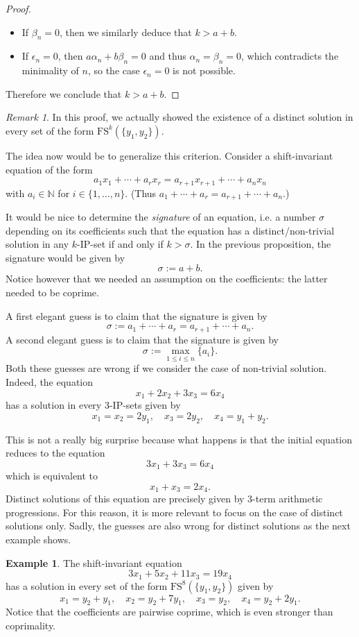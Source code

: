 \documentclass{article}
\theoremstyle{definition}
\newtheorem{example}{Example}[section]
\theoremstyle{plain}
\theoremstyle{remark}
\newtheorem{remark}{Remark}[section]
\newcommand{\N}{\ensuremath{\mathbb{N}}}
\newcommand{\FS}[2][]{\ensuremath{\mathrm{FS}^{#1}\left(#2\right)}}
\begin{document}
\begin{proof}
\begin{itemize}
        \item[-]  If $\beta_n=0$, then we similarly deduce that $k> a+ b$.
        
        \item[-]  If $\epsilon_n=0$, then $a\alpha_n+b\beta_n=0$ and thus $\alpha_n=\beta_n=0$, which contradicts the minimality of $n$, so the case $\epsilon_n=0$ is not possible.
    \end{itemize}

   Therefore we conclude that $k> a+b$.
\end{proof}
\begin{remark}\label{remark_shift_inv_basecase}
    In this proof, we actually showed the existence of a distinct solution in every set of the form $\FS[k]{\{y_1,y_2\}}$.\\ 
\end{remark}

The idea now would be to generalize this criterion. Consider a shift-invariant equation of the form
$$a_1 x_1 + \cdots + a_r x_r = a_{r+1} x_{r+1} + \cdots + a_n x_n$$
with $a_i \in \N$ for $i\in \{1,\ldots,n\}$. (Thus $a_1 + \cdots + a_r = a_{r+1}+ \cdots + a_n$.)

It would be nice to determine the \emph{signature} of an equation, i.e. a number $\sigma$ depending on its coefficients such that the equation has a distinct/non-trivial solution in any $k$-IP-set if and only if $k> \sigma$. In the previous proposition, the signature would be given by $$\sigma := a + b.$$
Notice however that we needed an assumption on the coefficients: the latter needed to be coprime.


A first elegant guess is to claim that the signature is given by
$$\sigma:= a_1 + \cdots + a_r = a_{r+1} + \cdots + a_n .$$
A second elegant guess is to claim that the signature is given by
$$\sigma:= \max_{1\leq i \leq n}\{a_i\}.$$
Both these guesses are wrong if we consider the case of non-trivial solution. Indeed, the equation 
$$x_1 + 2x_2 + 3 x_3 = 6 x_4$$
has a solution in every $3$-IP-sets given by 
$$x_1 = x_2 = 2 y_1, \quad x_3 = 2 y_2, \quad x_4 = y_1 + y_2.$$

This is not a really big surprise because what happens is that the initial equation reduces to the equation
$$3 x_1 + 3 x_3 = 6 x_4$$
which is equivalent to
$$x_1 + x_3 = 2x_4.$$
Distinct solutions of this equation are precisely given by 3-term arithmetic progressions. For this reason, it is more relevant to focus on the case of distinct solutions only. Sadly, the guesses are also wrong for distinct solutions as the next example shows.
\begin{example}
    The shift-invariant equation
    $$3x_1+ 5x_2 + 11 x_3 = 19 x_4$$
    has a solution in every set of the form $\FS[8]{\{y_1,y_2\}}$ given by 
    $$x_1 = y_2 + y_1, \quad x_2 = y_2 + 7 y_1, \quad x_3 = y_2, \quad x_4 = y_2 + 2 y_1.$$
    Notice that the coefficients are pairwise coprime, which is even stronger than coprimality.
\end{example}
\end{document}

